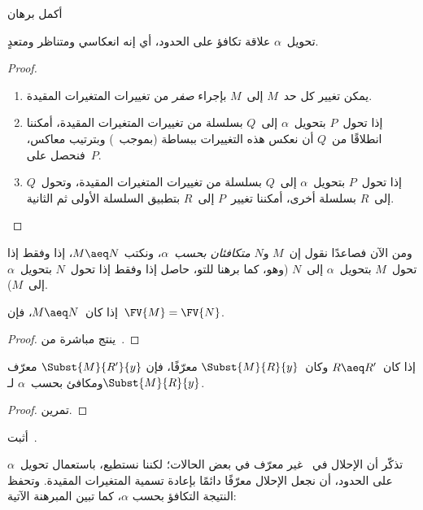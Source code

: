 \documentclass[../../../include/open-logic-section]{subfiles}
\begin{document}
\begin{prob}
  أكمل برهان~
\end{prob}

\begin{thm}
  تحويل~$\alpha$ علاقة تكافؤ على الحدود، أي إنه انعكاسي ومتناظر ومتعدٍ.
\end{thm}

\begin{proof}
  \begin{enumerate}
  \item يمكن تغيير كل حد~$M$ إلى~$M$ بإجراء \emph{صفر} من تغييرات
    المتغيرات المقيدة.
  \item إذا تحول~$P$ بتحويل~$\alpha$ إلى~$Q$ بسلسلة من تغييرات
    المتغيرات المقيدة، أمكننا انطلاقًا من~$Q$ أن نعكس هذه التغييرات
    ببساطة (بموجب~) وبترتيب معاكس، فنحصل على~$P$.
  \item إذا تحول~$P$ بتحويل~$\alpha$ إلى~$Q$ بسلسلة من تغييرات
    المتغيرات المقيدة، وتحول~$Q$ إلى~$R$ بسلسلة أخرى، أمكننا تغيير~$P$
    إلى~$R$ بتطبيق السلسلة الأولى ثم الثانية.
  \end{enumerate}
\end{proof}

ومن الآن فصاعدًا نقول إن~$M$ و$N$ \emph{متكافئان بحسب~$\alpha$}، ونكتب
$M \aeq N$، إذا وفقط إذا تحول~$M$ بتحويل~$\alpha$ إلى~$N$ (وهو، كما
برهنا للتو، حاصل إذا وفقط إذا تحول~$N$ بتحويل~$\alpha$ إلى~$M$).

\begin{thm}
  إذا كان~$M \aeq N$، فإن~$\FV{M} = \FV{N}$.
\end{thm}

\begin{proof}
  ينتج مباشرة من~.
\end{proof}

\begin{lem}
  إذا كان~$R \aeq R'$ وكان~$\Subst{M}{R}{y}$ معرّفًا، فإن
  $\Subst{M}{R'}{y}$ معرّف ومكافئ بحسب~$\alpha$ لـ$\Subst{M}{R}{y}$.
\end{lem}

\begin{proof}
  تمرين.
\end{proof}

\begin{prob}
  أثبت~.
\end{prob}

تذكّر أن الإحلال في~ غير معرّف في بعض الحالات؛ لكننا
نستطيع، باستعمال تحويل~$\alpha$ على الحدود، أن نجعل الإحلال معرّفًا
دائمًا بإعادة تسمية المتغيرات المقيدة. وتحفظ النتيجة التكافؤ بحسب
$\alpha$، كما تبين المبرهنة الآتية:
\end{document}
